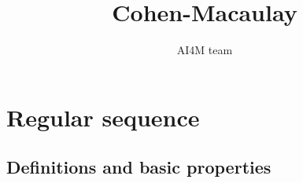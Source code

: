 \def\scrG{\mathscr{G}}
\def\scrH{\mathscr{H}}
\def\scrI{\mathscr{I}}
\def\scrJ{\mathscr{J}}
\def\scrK{\mathscr{K}}
\def\scrL{\mathscr{L}}
\def\scrM{\mathscr{M}}
\def\scrN{\mathscr{N}}
\def\scrO{\mathscr{O}}
\def\scrP{\mathscr{P}}
\def\scrQ{\mathscr{Q}}
\def\scrR{\mathscr{R}}
\def\scrS{\mathscr{S}}
\def\scrT{\mathscr{T}}
\def\scrU{\mathscr{U}}
\def\scrV{\mathscr{V}}
\def\scrW{\mathscr{W}}
\def\scrX{\mathscr{X}}
\def\scrY{\mathscr{Y}}
\def\scrZ{\mathscr{Z}}
\def\i{\mathbf{i}}
\def\j{\mathbf{j}}
\def\k{\mathbf{k}}
\def\sfa{\mathsf{a}}
\def\sfb{\mathsf{b}}
\def\sfc{\mathsf{c}}
\def\sfd{\mathsf{d}}
\def\sfe{\mathsf{e}}
\def\sff{\mathsf{f}}
\def\sfg{\mathsf{g}}
\def\sfh{\mathsf{h}}
\def\sfi{\mathsf{i}}
\def\sfj{\mathsf{j}}
\def\sfk{\mathsf{k}}
\def\sfl{\mathsf{l}}
\def\sfm{\mathsf{m}}
\def\sfn{\mathsf{n}}
\def\sfo{\mathsf{o}}
\def\sfp{\mathsf{p}}
\def\sfq{\mathsf{q}}
\def\sfr{\mathsf{r}}
\def\sfs{\mathsf{s}}
\def\sft{\mathsf{t}}
\def\sfu{\mathsf{u}}
\def\sfv{\mathsf{v}}
\def\sfw{\mathsf{w}}
\def\sfx{\mathsf{x}}
\def\sfy{\mathsf{y}}
\def\sfz{\mathsf{z}}
\def\sfA{\mathsf{A}}
\def\sfB{\mathsf{B}}
\def\sfC{\mathsf{C}}
\def\sfD{\mathsf{D}}
\def\sfE{\mathsf{E}}
\def\sfF{\mathsf{F}}
\def\sfG{\mathsf{G}}
\def\sfH{\mathsf{H}}
\def\sfI{\mathsf{I}}
\def\sfJ{\mathsf{J}}
\def\sfK{\mathsf{K}}
\def\sfL{\mathsf{L}}
\def\sfM{\mathsf{M}}
\def\sfN{\mathsf{N}}
\def\sfO{\mathsf{O}}
\def\sfP{\mathsf{P}}
\def\sfQ{\mathsf{Q}}
\def\sfR{\mathsf{R}}
\def\sfS{\mathsf{S}}
\def\sfT{\mathsf{T}}
\def\sfU{\mathsf{U}}
\def\sfV{\mathsf{V}}
\def\sfW{\mathsf{W}}
\def\sfX{\mathsf{X}}
\def\sfY{\mathsf{Y}}
\def\sfZ{\mathsf{Z}}

\newcommand{\Fil}{\mathrm{Fil}}
\newcommand{\Gr}{\mathrm{Gr}}
\newcommand{\Rees}{\mathrm{Ree}}
\DeclareMathOperator{\supp}{Supp}
\DeclareMathOperator{\Ker}{Ker}
\DeclareMathOperator{\Ext}{Ext}
\DeclareMathOperator{\Ann}{Ann}
\DeclareMathOperator{\Hom}{Hom}
\DeclareMathOperator{\Tor}{Tor}
\DeclareMathOperator{\depth}{depth}
\DeclareMathOperator{\Ass}{Ass}

\title{Cohen-Macaulay}
\author{AI4M team}

	
	\maketitle
	
	
	\section{Regular sequence}
	
	\subsection{Definitions and basic properties}
	
